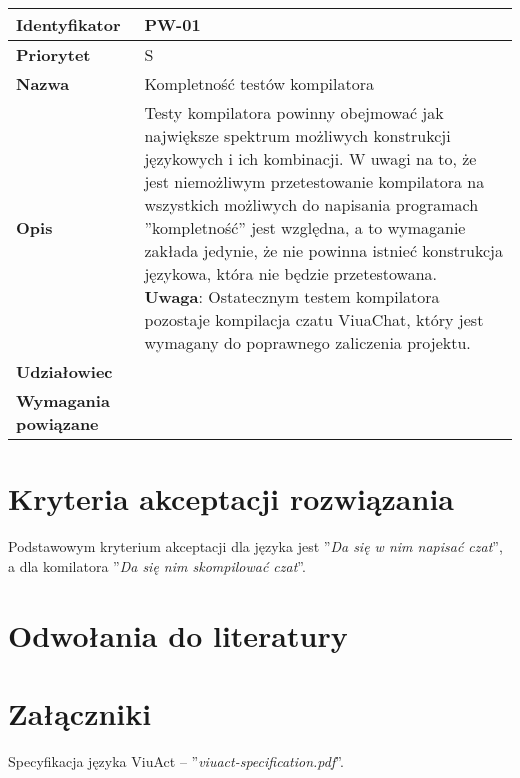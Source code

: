 \documentclass[11pt,oneside,a4paper,titlepage,onecolumn]{article}
\begin{document}
\vspace{1em}

\begin{tabular}{ | l | l | }
    \hline
    \textbf{Identyfikator} & \parbox[t]{11cm}{PW-01} \\
    \hline
    \textbf{Priorytet} & S \\
    \hline
    \textbf{Nazwa} & Kompletność testów kompilatora \\
    \hline
    \textbf{Opis} & \parbox[t]{11cm}{
        Testy kompilatora powinny obejmować jak największe spektrum możliwych konstrukcji językowych i
        ich kombinacji. W uwagi na to, że jest niemożliwym przetestowanie kompilatora na wszystkich
        możliwych do napisania programach ''kompletność'' jest względna, a to wymaganie zakłada jedynie, że
        nie powinna istnieć konstrukcja językowa, która nie będzie przetestowana. \\
        \textbf{Uwaga}: Ostatecznym testem kompilatora pozostaje kompilacja czatu ViuaChat, który jest
        wymagany do poprawnego zaliczenia projektu.
    } \\
    \hline
    \textbf{Udziałowiec} & \phantom{} \\
    \hline
    \textbf{Wymagania powiązane} & \phantom{} \\
    \hline
\end{tabular}

\section{Kryteria akceptacji rozwiązania}

Podstawowym kryterium akceptacji dla języka jest ''\emph{Da się w nim napisać czat}'', a
dla komilatora ''\emph{Da się nim skompilować czat}''.

\section{Odwołania do literatury}

\section{Załączniki}

Specyfikacja języka ViuAct -- ''\emph{viuact-specification.pdf}''.
\end{document}

